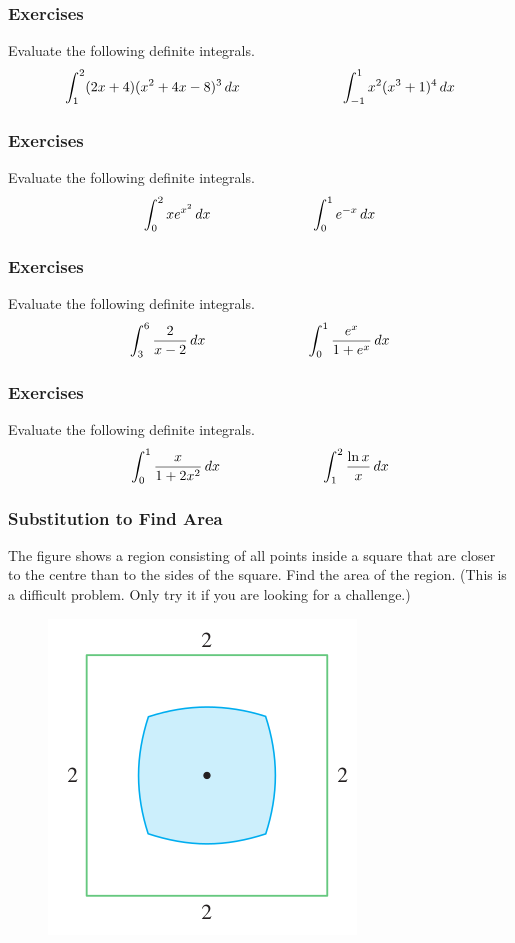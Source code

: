 \documentclass[xcolor=dvipsnames]{beamer}
\begin{document}
\begin{frame}
  \frametitle{Exercises}
{\ubung} Evaluate the following definite integrals.
\begin{equation}
  \label{eq:aigighau}
  \int_{1}^{2}(2x+4)(x^{2}+4x-8)^{3}\,dx\hspace{1in}\int_{-1}^{1}x^{2}(x^{3}+1)^{4}\,dx\notag
\end{equation}
\end{frame}

\begin{frame}
  \frametitle{Exercises}
{\ubung} Evaluate the following definite integrals.
\begin{equation}
  \label{eq:omixughu}
  \int_{0}^{2}xe^{x^{2}}\,dx\hspace{1in}\int_{0}^{1}e^{-x}\,dx\notag
\end{equation}
\end{frame}

\begin{frame}
  \frametitle{Exercises}
{\ubung} Evaluate the following definite integrals.
\begin{equation}
  \label{eq:baemixeg}
  \int_{3}^{6}\frac{2}{x-2}\,dx\hspace{1in}\int_{0}^{1}\frac{e^{x}}{1+e^{x}}\,dx\notag
\end{equation}
\end{frame}

\begin{frame}
  \frametitle{Exercises}
{\ubung} Evaluate the following definite integrals.
\begin{equation}
  \label{eq:aeteepah}
  \int_{0}^{1}\frac{x}{1+2x^{2}}\,dx\hspace{1in}\int_{1}^{2}\frac{\ln{}x}{x}\,dx\notag
\end{equation}
\end{frame}

\begin{frame}
  \frametitle{Substitution to Find Area}
  {\ubung} The figure shows a region consisting of all points inside a
  square that are closer to the centre than to the sides of the
  square. Find the area of the region. (This is a difficult problem.
  Only try it if you are looking for a challenge.)
  \begin{figure}[h]
    \includegraphics[scale=0.5]{./diagrams/squarish.png}
  \end{figure}
\end{frame}
\end{document}
